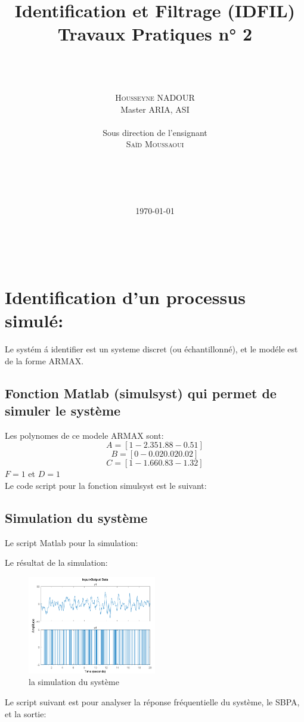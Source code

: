 \documentclass[twoside,twocolumn]{article}
\title{Identification et Filtrage (IDFIL)  Travaux Pratiques n° 2} %
\author{%
\noindent\rule{6cm}{1pt} \\ \\
\LARGE
\textsc{Housseyne NADOUR}\\[1ex] %
\normalsize Master ARIA, ASI \\ %
\\
\normalsize Sous direction de l'ensignant \\ %
\LARGE
\textsc{Saïd Moussaoui}\\[1ex] %
\noindent\rule{6cm}{1pt} \\ \\
}
\date{\today}
\begin{document}
\maketitle
\
\tableofcontents
\newpage

\section{Identification d'un processus simulé:}
Le systém á identifier est un systeme discret (ou échantillonné), et le modéle est de la forme ARMAX.
\subsection{Fonction Matlab (simulsyst) qui permet de simuler le système}
Les polynomes de ce modele ARMAX sont:
$$A=[1 -2.35 1.88 -0.51]$$ $$B=[0 -0.02 0.02 0.02]$$ $$C=[1 -1.66 0.83 -1.32]$$ $F=1$ et $D=1$ \\
Le code script pour la fonction simulsyst est le suivant:
\label{matlab}


\subsection{Simulation du système}
Le script Matlab pour la simulation:
\label{matlab}

Le résultat de la simulation:
\begin{figure}[H]
\centering
\includegraphics[width=0.5\textwidth]{Images/1.png}
\caption{ la simulation du système}
\end{figure}

Le script suivant est pour analyser la réponse fréquentielle du système, le SBPA, et la sortie:
\label{matlab}

\end{document}
